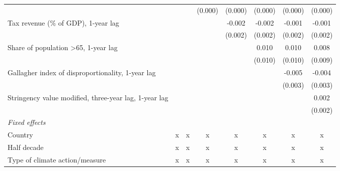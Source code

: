 \begin{tabular}{lccccccc}
                                                                   &                &                & (0.000)        & (0.000)       & (0.000)       & (0.000)       & (0.000)\\   
   Tax revenue (\% of GDP), 1-year lag                             &                &                &                & -0.002        & -0.002        & -0.001        & -0.001\\   
                                                                   &                &                &                & (0.002)       & (0.002)       & (0.002)       & (0.002)\\   
   Share of population >65, 1-year lag                             &                &                &                &               & 0.010         & 0.010         & 0.008\\   
                                                                   &                &                &                &               & (0.010)       & (0.010)       & (0.009)\\   
   Gallagher index of disproportionality, 1-year lag               &                &                &                &               &               & -0.005        & -0.004\\   
                                                                   &                &                &                &               &               & (0.003)       & (0.003)\\   
   Stringency value modified, three-year lag, 1-year lag           &                &                &                &               &               &               & 0.002\\   
                                                                   &                &                &                &               &               &               & (0.002)\\   
   \emph{Fixed effects}\\
   Country                                                         & x              & x              & x              & x             & x             & x             & x\\  
   Half decade                                                     & x              & x              & x              & x             & x             & x             & x\\  
   Type of climate action/measure                                  & x              & x              & x              & x             & x             & x             & x\\  

\end{tabular}
